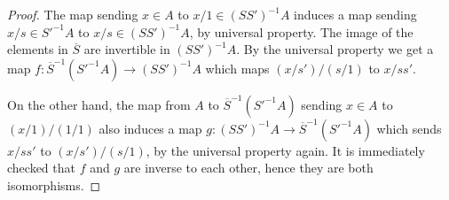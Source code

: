 \documentclass[10pt,a4paper]{amsart}
\theoremstyle{plain}
\theoremstyle{definition}
\theoremstyle{remark}
\numberwithin{equation}{subsection}
\begin{document}
\begin{proof}
The map sending $x\in A$ to $x/1\in (SS')^{-1}A$ induces a map
sending $x/s\in S'^{-1}A$ to $x/s \in (SS')^{-1}A$, by universal
property. The image of the elements in $\overline{S}$ are invertible
in $(SS')^{-1}A$. By the universal property we get a map
$f : \overline{S}^{-1}(S'^{-1}A) \to (SS')^{-1}A$ which maps
$(x/s')/(s/1)$ to $x/ss'$.

\medskip\noindent
On the other hand, the map from $A$ to $\overline{S}^{-1}(S'^{-1}A)$
sending $x\in A$ to $(x/1)/(1/1)$ also induces a map
$g : (SS')^{-1}A \to \overline{S}^{-1}(S'^{-1}A)$ which sends $x/ss'$
to $(x/s')/(s/1)$, by the universal property again. It is
immediately checked that $f$ and $g$ are inverse to each other,
hence they are both isomorphisms.
\end{proof}
\end{document}
